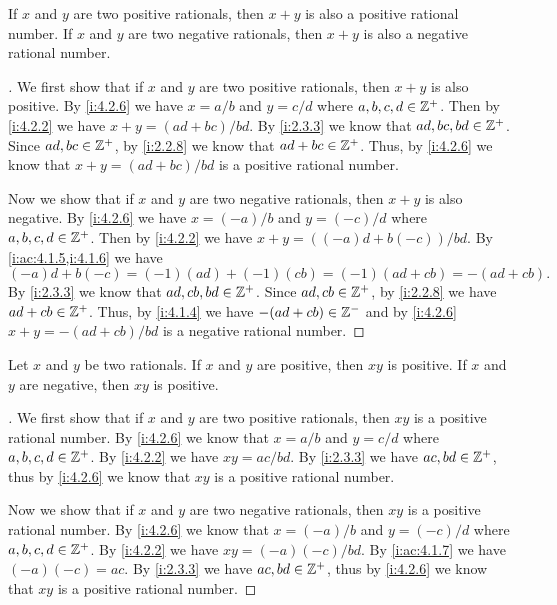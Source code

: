 \begin{ac}\label{i:ac:4.2.6}
  If \(x\) and \(y\) are two positive rationals, then \(x + y\) is also a positive rational number.
  If \(x\) and \(y\) are two negative rationals, then \(x + y\) is also a negative rational number.
\end{ac}

\begin{proof}[]
  We first show that if \(x\) and \(y\) are two positive rationals, then \(x + y\) is also positive.
  By \cref{i:4.2.6} we have \(x = a / b\) and \(y = c / d\) where \(a, b, c, d \in \mathbb{Z}^+\).
  Then by \cref{i:4.2.2} we have \(x + y = (ad + bc) / bd\).
  By \cref{i:2.3.3} we know that \(ad, bc, bd \in \mathbb{Z}^+\).
  Since \(ad, bc \in \mathbb{Z}^+\), by \cref{i:2.2.8} we know that \(ad + bc \in \mathbb{Z}^+\).
  Thus, by \cref{i:4.2.6} we know that \(x + y = (ad + bc) / bd\) is a positive rational number.

  Now we show that if \(x\) and \(y\) are two negative rationals, then \(x + y\) is also negative.
  By \cref{i:4.2.6} we have \(x = (-a) / b\) and \(y = (-c) / d\) where \(a, b, c, d \in \mathbb{Z}^+\).
  Then by \cref{i:4.2.2} we have \(x + y = ((-a)d + b(-c)) / bd\).
  By \cref{i:ac:4.1.5,i:4.1.6} we have
  \[
    (-a)d + b(-c) = (-1) (ad) + (-1) (cb) = (-1)(ad + cb) = -(ad + cb).
  \]
  By \cref{i:2.3.3} we know that \(ad, cb, bd \in \mathbb{Z}^+\).
  Since \(ad, cb \in \mathbb{Z}^+\), by \cref{i:2.2.8} we have \(ad + cb \in \mathbb{Z}^+\).
  Thus, by \cref{i:4.1.4} we have \(-(ad + cb) \in \mathbb{Z}^-\) and by \cref{i:4.2.6} \(x + y = -(ad + cb) / bd\) is a negative rational number.
\end{proof}

\begin{ac}\label{i:ac:4.2.7}
  Let \(x\) and \(y\) be two rationals.
  If \(x\) and \(y\) are positive, then \(xy\) is positive.
  If \(x\) and \(y\) are negative, then \(xy\) is positive.
\end{ac}

\begin{proof}[]
  We first show that if \(x\) and \(y\) are two positive rationals, then \(xy\) is a positive rational number.
  By \cref{i:4.2.6} we know that \(x = a / b\) and \(y = c / d\) where \(a, b, c, d \in \mathbb{Z}^+\).
  By \cref{i:4.2.2} we have \(xy = ac / bd\).
  By \cref{i:2.3.3} we have \(ac, bd \in \mathbb{Z}^+\), thus by \cref{i:4.2.6} we know that \(xy\) is a positive rational number.

  Now we show that if \(x\) and \(y\) are two negative rationals, then \(xy\) is a positive rational number.
  By \cref{i:4.2.6} we know that \(x = (-a) / b\) and \(y = (-c) / d\) where \(a, b, c, d \in \mathbb{Z}^+\).
  By \cref{i:4.2.2} we have \(xy = (-a)(-c) / bd\).
  By \cref{i:ac:4.1.7} we have \((-a)(-c) = ac\).
  By \cref{i:2.3.3} we have \(ac, bd \in \mathbb{Z}^+\), thus by \cref{i:4.2.6} we know that \(xy\) is a positive rational number.
\end{proof}

